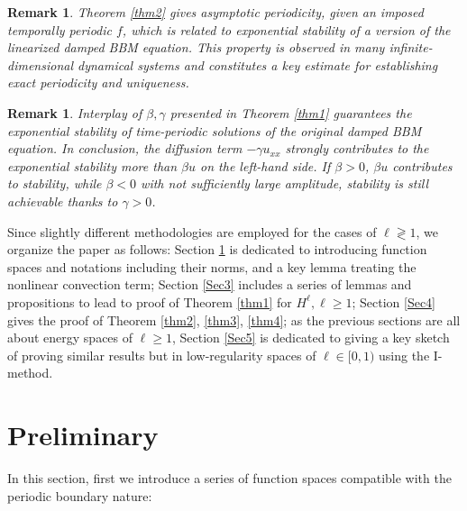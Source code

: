 \documentclass[10pt,a4paper,final]{article}
\numberwithin{equation}{section}
\newtheorem{remark}[theorem]{Remark}
\newcommand{\Z}{\mathbb{Z}}
\newcommand{\R}{\mathbb{R}}
\newcommand{\bT}{\mathbb{T}}
\newcommand{\Gb}{\beta}
\newcommand{\Gg}{\gamma}
\begin{document}
\begin{remark}
Theorem \ref{thm2} gives asymptotic periodicity, given an imposed temporally periodic $f$, which is related to exponential stability of a version of the linearized damped BBM equation. This property is observed in many infinite-dimensional dynamical systems and constitutes a key estimate for establishing exact periodicity and uniqueness.
\end{remark}

\begin{remark}
Interplay of $\Gb, \Gg$ presented in Theorem \ref{thm1} guarantees the exponential stability of time-periodic solutions of the original damped BBM equation. In conclusion, the diffusion term $-\Gg u_{xx}$ strongly contributes to the exponential stability more than $\Gb u$ on the left-hand side. If $\Gb>0$, $\Gb u$ contributes to stability, while $\Gb<0$ with not sufficiently large amplitude, stability is still achievable thanks to $\Gg>0$. 
\end{remark}


Since slightly different methodologies are employed for the cases of $\ell\gtrless1$, we organize the paper as follows: Section \ref{pre} is dedicated to introducing function spaces and notations including their norms, and a key lemma treating the nonlinear convection term; Section \ref{Sec3} includes a series of lemmas and propositions to lead to proof of Theorem \ref{thm1} for $H^{\ell}, \ell\ge 1$; Section \ref{Sec4} gives the proof of Theorem \ref{thm2}, \ref{thm3}, \ref{thm4}; as the previous sections are all about energy spaces of $\ell\ge 1$, Section \ref{Sec5} is dedicated to giving a key sketch of proving similar results but in low-regularity spaces of $\ell\in[0, 1)$ using the I-method. 

\section{Preliminary} \label{pre}

In this section, first we introduce a series of function spaces compatible with the periodic boundary nature: 
\end{document}
